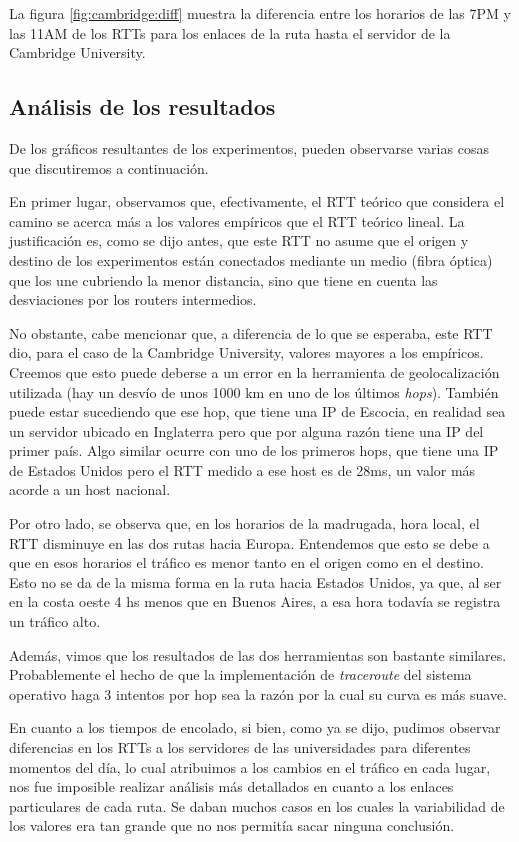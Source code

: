 La figura \ref{fig:cambridge:diff} muestra la diferencia entre los horarios de
las 7PM y las 11AM de los RTTs para los enlaces de la ruta hasta el servidor
de la Cambridge University.

\subsection{Análisis de los resultados}
De los gráficos resultantes de los experimentos, pueden observarse varias
cosas que discutiremos a continuación.

En primer lugar, observamos que, efectivamente, el RTT teórico que considera
el camino se acerca más a los valores empíricos que el RTT teórico lineal. La
justificación es, como se dijo antes, que este RTT no asume que el origen y
destino de los experimentos están conectados mediante un medio (fibra óptica)
que los une cubriendo la menor distancia, sino que tiene en cuenta las
desviaciones por los routers intermedios.

No obstante, cabe mencionar que, a diferencia de lo que se esperaba, este RTT
dio, para el caso de la Cambridge University, valores mayores a los empíricos.
Creemos que esto puede deberse a un error en la herramienta de geolocalización
utilizada (hay un desvío de unos 1000 km en uno de los últimos \emph{hops}).
También puede estar sucediendo que ese hop, que tiene una IP de Escocia, en
realidad sea un servidor ubicado en Inglaterra pero que por alguna razón tiene
una IP del primer país. Algo similar ocurre con uno de los primeros hops, que
tiene una IP de Estados Unidos pero el RTT medido a ese host es de 28ms, un
valor más acorde a un host nacional.

Por otro lado, se observa que, en los horarios de la madrugada, hora local, el
RTT disminuye en las dos rutas hacia Europa. Entendemos que esto se debe a que
en esos horarios el tráfico es menor tanto en el origen como en el destino.
Esto no se da de la misma forma en la ruta hacia Estados Unidos, ya que, al
ser en la costa oeste 4 hs menos que en Buenos Aires, a esa hora todavía se
registra un tráfico alto.

Además, vimos que los resultados de las dos herramientas son bastante
similares. Probablemente el hecho de que la implementación de
\emph{traceroute} del sistema operativo haga 3 intentos por hop sea la razón
por la cual su curva es más suave.

En cuanto a los tiempos de encolado, si bien, como ya se dijo, pudimos
observar diferencias en los RTTs a los servidores de las universidades para
diferentes momentos del día, lo cual atribuimos a los cambios en el tráfico en
cada lugar, nos fue imposible realizar análisis más detallados en cuanto a los
enlaces particulares de cada ruta. Se daban muchos
casos en los cuales la variabilidad de los valores era tan grande que no nos
permitía sacar ninguna conclusión.

